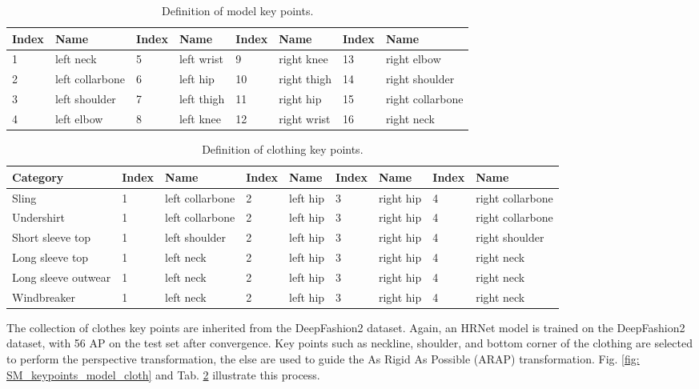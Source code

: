 \documentclass[10pt,twocolumn,letterpaper]{article}
\begin{document}
\begin{table}[h]
    \caption{Definition of model key points.}
    \label{tab:model_keypoints}
    \centering
    \begin{tabular}{llllllll}
        \toprule
        Index & Name & Index & Name & Index & Name & Index & Name \\ 
        \midrule
        1 & left neck & 5 & left wrist & 9 & right knee & 13 & right elbow \\ 
        2 & left collarbone & 6 & left hip & 10 & right thigh & 14 & right shoulder\\ 
        3 & left shoulder & 7 & left thigh &  11 & right hip & 15 & right collarbone \\ 
        4 & left elbow & 8 & left knee & 12 & right wrist & 16 & right neck \\ 
        \bottomrule
    \end{tabular}
\end{table}


\begin{table}[h]
    \caption{Definition of clothing key points.}
    \label{tab:clothing_keypoints}
    \centering
    \begin{tabular}{lllllllll}
        \toprule
        Category & Index & Name & Index & Name & Index & Name & Index & Name \\ 
        \midrule
        Sling & 1 & left collarbone & 2 & left hip & 3 & right hip & 4 & right collarbone\\ 
        Undershirt & 1 & left collarbone & 2 & left hip & 3 & right hip & 4 & right collarbone\\ 
        Short sleeve top & 1 & left shoulder & 2 & left hip & 3 & right hip & 4 & right shoulder\\ 
        Long sleeve top & 1 & left neck & 2 & left hip & 3 & right hip & 4 & right neck\\ 
        Long sleeve outwear & 1 & left neck & 2 & left hip & 3 & right hip & 4 & right neck\\ 
        Windbreaker & 1 & left neck & 2 & left hip & 3 & right hip & 4 & right neck\\ 
        \bottomrule
    \end{tabular}
\end{table}

The collection of clothes key points are inherited from the DeepFashion2 \cite{ge2019deepfashion2} dataset. Again, an HRNet model is trained on the DeepFashion2 dataset, with 56 AP on the test set after convergence. Key points such as neckline, shoulder, and bottom corner of the clothing are selected to perform the perspective transformation, the else are used to guide the As Rigid As Possible (ARAP) \cite{alexa2000rigid,igarashi2005rigid} transformation. Fig. \ref{fig: SM_keypoints_model_cloth} and Tab. \ref{tab:clothing_keypoints} illustrate this process.
\end{document}
